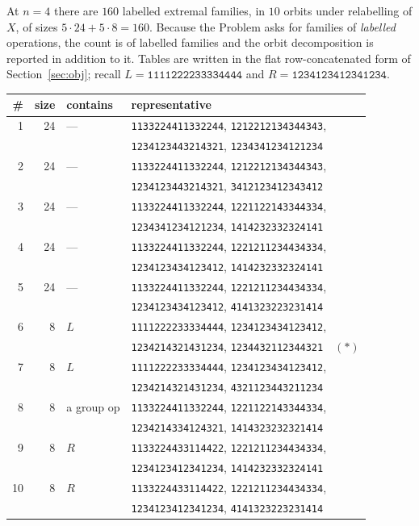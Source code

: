 \documentclass[11pt]{amsart}
\theoremstyle{remark}
\theoremstyle{definition}
\begin{document}
At $n=4$ there are $160$ labelled extremal families, in $10$ orbits under relabelling of $X$, of
sizes $5\cdot24+5\cdot8=160$. Because the Problem asks for families of \emph{labelled} operations, the
count is of labelled families and the orbit decomposition is reported in addition to it. Tables are
written in the flat row-concatenated form of Section~\ref{sec:obj}; recall
$L=\texttt{1111222233334444}$ and $R=\texttt{1234123412341234}$.

\begin{center}
\footnotesize
\begin{tabular}{@{}rrll@{}}
\# & size & contains & representative\\
\hline
1 & 24 & --- & \texttt{1133224411332244}, \texttt{1212212134344343},\\
  &   &   & \texttt{1234123443214321}, \texttt{1234341234121234}\\
2 & 24 & --- & \texttt{1133224411332244}, \texttt{1212212134344343},\\
  &   &   & \texttt{1234123443214321}, \texttt{3412123412343412}\\
3 & 24 & --- & \texttt{1133224411332244}, \texttt{1221122143344334},\\
  &   &   & \texttt{1234341234121234}, \texttt{1414232332324141}\\
4 & 24 & --- & \texttt{1133224411332244}, \texttt{1221211234434334},\\
  &   &   & \texttt{1234123434123412}, \texttt{1414232332324141}\\
5 & 24 & --- & \texttt{1133224411332244}, \texttt{1221211234434334},\\
  &   &   & \texttt{1234123434123412}, \texttt{4141323223231414}\\
6 & 8 & $L$ & \texttt{1111222233334444}, \texttt{1234123434123412},\\
  &   &   & \texttt{1234214321431234}, \texttt{1234432112344321}\ \ $(\ast)$\\
7 & 8 & $L$ & \texttt{1111222233334444}, \texttt{1234123434123412},\\
  &   &   & \texttt{1234214321431234}, \texttt{4321123443211234}\\
8 & 8 & a group op & \texttt{1133224411332244}, \texttt{1221122143344334},\\
  &   &   & \texttt{1234214334124321}, \texttt{1414323232321414}\\
9 & 8 & $R$ & \texttt{1133224433114422}, \texttt{1221211234434334},\\
  &   &   & \texttt{1234123412341234}, \texttt{1414232332324141}\\
10 & 8 & $R$ & \texttt{1133224433114422}, \texttt{1221211234434334},\\
  &   &   & \texttt{1234123412341234}, \texttt{4141323223231414}\\
\end{tabular}
\end{center}
\end{document}
